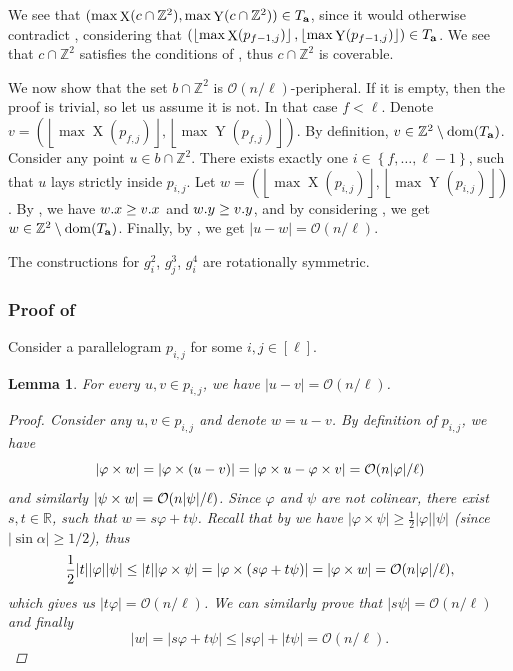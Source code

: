 \documentclass[11pt]{article}
\newcommand{\Z}{\mathbb{Z}}
\renewcommand{\O}{\mathcal{O}}
\renewcommand{\phi}{\varphi}
\newcommand{\set}[1]{\left\lbrace #1 \right\rbrace}
\newcommand{\floor}[1]{\left\lfloor #1 \right\rfloor}
\theoremstyle{plain}
\newtheorem{lemma}{Lemma}
\theoremstyle{definition}
\theoremstyle{remark}
\DeclareMathOperator*{\X}{X}
\DeclareMathOperator*{\Y}{Y}
\begin{document}
We see that $(\max \X(c \cap \Z^2), \max \Y(c \cap \Z^2)) \in \Ta$, since it would otherwise contradict ,
considering that
$(\floor{\max \X(p_{f - 1, j})}, \floor{\max \Y(p_{f - 1, j})}) \in \Ta$.
We see that $c \cap \Z^2$ satisfies the conditions of , thus $c \cap \Z^2$ is coverable.

We now show that the set $b \cap \Z^2$ is $\O(n / \ell)$-peripheral.
If it is empty, then the proof is trivial, so let us assume it is not.
In that case $f < \ell$.
Denote $v = (\floor{\max \X(p_{f, j})}, \floor{\max \Y(p_{f, j})})$.
By definition, $v \in \Z^2 \setminus \d{\Ta}$.
Consider any point $u \in b \cap \Z^2$.
There exists exactly one $i \in \set{f, \dots, \ell - 1}$, such that $u$ lays strictly inside $p_{i, j}$.
Let $w = (\floor{\max \X(p_{i, j})}, \floor{\max \Y(p_{i, j})})$.
By , we have $w.x \ge v.x$ and $w.y \ge v.y$, and by considering ,
we get $w \in \Z^2 \setminus \d{\Ta}$.
Finally, by , we get $|u - w| = \O(n / \ell)$.

The constructions for $g^2_i$, $g^3_j$, $g^4_i$ are rotationally symmetric.


\subsubsection{Proof of } \label{distance_bound_lemma_proof}

Consider a parallelogram $p_{i, j}$ for some $i, j \in [\ell]$.

\begin{lemma}\label{distance_bound_aux}
	For every $u, v \in p_{i, j}$, we have $|u - v| = \O(n / \ell)$.
	\begin{proof}
		Consider any $u, v \in p_{i, j}$ and denote $w = u - v$.
		By definition of $p_{i, j}$, we have
		\[ |\h{w}| = |\h{(u - v)}| = |\h{u} - \h{v}| = \O(n|\phi| / \ell) \]
		and similarly $|\s{w}| = \O(n|\psi| / \ell)$.
		Since $\phi$ and $\psi$ are not colinear, there exist $s, t \in \mathbb{R}$, such that $w = s\phi + t\psi$.
		Recall that by  we have $|\phi \times \psi| \ge \frac{1}{2}|\phi||\psi|$ (since $|\sin \alpha| \ge 1/2$), thus
		\[ \frac{1}{2}|t||\phi||\psi| \le |t||\phi \times \psi| = |\phi \times (s\phi + t\psi)| = |\h{w}| = \O(n|\phi| / \ell), \]
		which gives us $|t\phi| = \O(n / \ell)$.
		We can similarly prove that $|s\psi| = \O(n / \ell)$ and finally
		\[ |w| = |s\phi + t\psi| \le |s\phi| + |t\psi| = \O(n / \ell). \]
	\end{proof}
\end{lemma}
\end{document}
